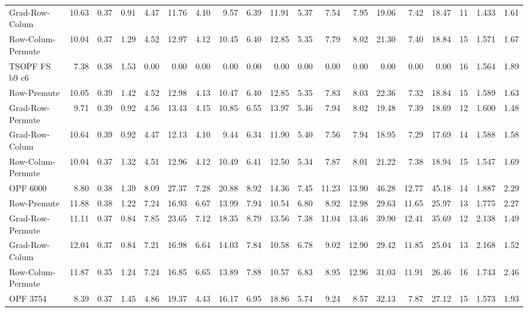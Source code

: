 \begin{table}[hbt]
\begin{tabular}{lrrrrrrrrrrrrrrrrrr}
Grad-Row-Colum       &10.63  &0.37 &  0.91 & 4.47 & 11.76 & 4.10 &  9.57  & 6.39  &11.91  & 5.37  & 7.54  &  7.95  &19.06  & 7.42  &18.47  &11  &1.433   &1.61  \\       
Row-Colum-Permute    &10.04  &0.37 &  1.29 & 4.52 & 12.97 & 4.12 & 10.45  & 6.40  &12.85  & 5.35  & 7.79  &  8.02  &21.30  & 7.40  &18.84  &15  &1.571   &1.67  \\ \hline
TSOPF FS b9 c6       & 7.38  &0.38 &  1.53 & 0.00 &  0.00 & 0.00 &  0.00  & 0.00  & 0.00  & 0.00  & 0.00  &  0.00  & 0.00  & 0.00  & 0.00  &16  &1.564   &1.89  \\       
Row-Premute          &10.05  &0.39 &  1.42 & 4.52 & 12.98 & 4.13 & 10.47  & 6.40  &12.85  & 5.35  & 7.83  &  8.03  &22.36  & 7.32  &18.84  &15  &1.589   &1.63  \\       
Grad-Row-Permute     & 9.71  &0.39 &  0.92 & 4.56 & 13.43 & 4.15 & 10.85  & 6.55  &13.97  & 5.46  & 7.94  &  8.02  &19.48  & 7.39  &18.69  &12  &1.600   &1.48  \\       
Grad-Row-Colum       &10.64  &0.39 &  0.92 & 4.47 & 12.13 & 4.10 &  9.44  & 6.34  &11.90  & 5.40  & 7.56  &  7.94  &18.95  & 7.29  &17.69  &14  &1.588   &1.58  \\       
Row-Colum-Permute    &10.04  &0.37 &  1.32 & 4.51 & 12.96 & 4.12 & 10.49  & 6.41  &12.50  & 5.34  & 7.87  &  8.01  &21.22  & 7.38  &18.94  &15  &1.547   &1.69  \\ \hline
OPF 6000             & 8.80  &0.38 &  1.39 & 8.09 & 27.37 & 7.28 & 20.88  & 8.92  &14.36  & 7.45  &11.23  & 13.90  &46.28  &12.77  &45.18  &14  &1.887   &2.29  \\       
Row-Premute          &11.88  &0.38 &  1.22 & 7.24 & 16.93 & 6.67 & 13.99  & 7.94  &10.54  & 6.80  & 8.92  & 12.98  &29.63  &11.65  &25.97  &13  &1.775   &2.27  \\       
Grad-Row-Permute     &11.11  &0.37 &  0.84 & 7.85 & 23.65 & 7.12 & 18.35  & 8.79  &13.56  & 7.38  &11.04  & 13.46  &39.90  &12.41  &35.69  &12  &2.138   &1.49  \\       
Grad-Row-Colum       &12.04  &0.37 &  0.84 & 7.21 & 16.98 & 6.64 & 14.03  & 7.84  &10.58  & 6.78  & 9.02  & 12.90  &29.42  &11.85  &25.04  &13  &2.168   &1.52  \\       
Row-Colum-Permute    &11.87  &0.35 &  1.24 & 7.24 & 16.85 & 6.65 & 13.89  & 7.88  &10.57  & 6.83  & 8.95  & 12.96  &31.03  &11.91  &26.46  &16  &1.743   &2.46  \\ \hline
OPF 3754             & 8.39  &0.37 &  1.45 & 4.86 & 19.37 & 4.43 & 16.17  & 6.95  &18.86  & 5.74  & 9.24  &  8.57  &32.13  & 7.87  &27.12  &15  &1.573   &1.93  \\       

\end{tabular}
\end{table}
